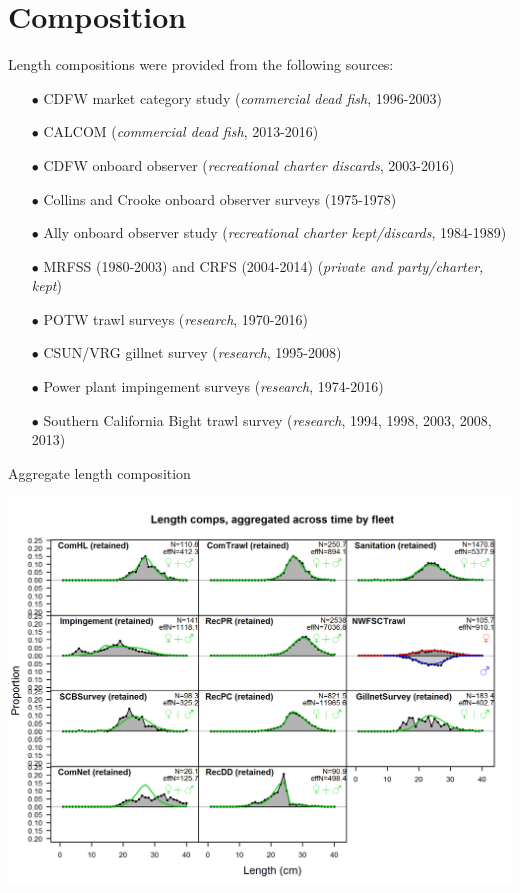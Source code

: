 \documentclass[ignorenonframetext,]{beamer}
\begin{document}
\section{Composition}\label{composition}

\begin{frame}{Length compositions were provided from the following
sources:}

\begin{itemize}
  \item[$\bullet$] CDFW market category study (\emph{commercial dead fish}, 1996-2003)    
  \item[$\bullet$] CALCOM (\emph{commercial dead fish}, 2013-2016)    
  \item[$\bullet$] CDFW onboard observer (\emph{recreational charter discards}, 2003-2016)  
  \item[$\bullet$] Collins and Crooke onboard observer surveys (1975-1978) 
  \item[$\bullet$] Ally onboard observer study (\emph{recreational charter kept/discards}, 1984-1989)  
  \item[$\bullet$] MRFSS (1980-2003) and CRFS (2004-2014) (\emph{private and party/charter, kept})
  \item[$\bullet$] POTW trawl surveys (\emph{research}, 1970-2016)      
  \item[$\bullet$] CSUN/VRG gillnet survey (\emph{research}, 1995-2008)        
  \item[$\bullet$] Power plant impingement surveys (\emph{research}, 1974-2016)  
  \item[$\bullet$] Southern California Bight trawl survey (\emph{research}, 1994, 1998, 2003, 2008, 2013) 
\end{itemize}

\end{frame}

\begin{frame}{Aggregate length composition}

\includegraphics{r4ss/plots_mod1/comp_lenfit__aggregated_across_time.png}

\end{frame}
\end{document}
